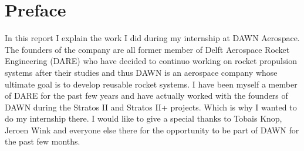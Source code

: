 \chapter{Preface}

In this report I explain the work I did during my internship at DAWN Aerospace. The founders of the company are all former member of Delft Aerospace Rocket Engineering (DARE) who have decided to continuo working on rocket propulsion systems after their studies and thus DAWN is an aerospace company whose ultimate goal is to develop reusable rocket systems. I have been myself a member of DARE for the past few years and have actually worked with the founders of DAWN during the Stratos II and Stratos II+ projects. Which is why I wanted to do my internship there. I would like to give a special thanks to Tobais Knop, Jeroen Wink and everyone else there for the opportunity to be part of DAWN for the past few months.


